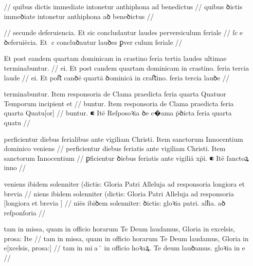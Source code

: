 \ex \bg
\gla
{}
{}
{} {} {} {} {} {} {} {} {} {}
{} {} {} {} {} {} {} {} {} {}
//
\glRekonstrukcja
{} quibus dictis immediate intonetur anthiphona ad benedictus
//
\glU
{}
quibus ꝺictis immeꝺiate intonetur anthiphona aꝺ beneꝺictus
//
\endgl
\eg


\ex \bg
\gla
{}
{} {} {} {} {} {} {} {} {} {}
{} {} {} {} {} {} {} {} {} {}
//
\glRekonstrukcja
{} secunde deferuiencia. Et sic concludautur laudes perversiculum feriale
//
\glU
{}
ſce ꝺeferuiēcia. Et c concluꝺautur lauꝺes ꝑverculum feriale
//
\endgl
\eg



\ex \bg
\gla
{}
{} Et post eandem quartam dominicam in crastino feria tertia laudes
ultimae terminabuntur.
//
\glRekonstrukcja
{}
ei. Et post candem quartam dominicam in crastino. feria tercia laude
//
\glU
{}
ei. Et poﬅ canꝺē quartā ꝺominicā in craﬅino. feria tercia lauꝺe
//
\endgl
\eg




\ex \bg
\gla
{} terminabuntur.
{} Item responsoria de Clama praedicta feria quarta Quatuor Temporum
incipient et 
//
\glRekonstrukcja
{} \relax[termina]buntur.
{} Item responsoria de Clama praedicta feria quarta Quatu[or]
//
\glU
{}
buntur. ⁌ Itē Reſposoꝛia ꝺe c�ama p̄ꝺicta feria quarta quatu
//
\endgl
\eg



\ex \bg
\gla
{} perficientur diebus ferialibus ante vigiliam Christi.
{} Item sanctorum Innocentium dominico veniens
//
\glRekonstrukcja
{} perficientur diebus feriatis ante vigiliam Christi.
{} Item sanctorum Innocentium
//
\glU
{}
ꝑficientur ꝺiebus feriatis ante vigiliā xp̄i. ⁌ Itē ſanctoꝝ inno
//
\endgl
\eg

\ex \bg
\gla
{} veniens ibidem solenniter
(dictis: Gloria Patri Alleluja ad responsoria longiora et brevia 
//
\glRekonstrukcja
{} \relax[ve]niens ibidem solenniter
(dictis: Gloria Patri Alleluja ad responsoria [longiora et brevia ]
//
\glU
{}
niēs ibiꝺem solenniter: ꝺictis: gloꝛia patri. alꝉia. aꝺ reſponſoria   
//
\endgl
\eg



\ex \bg
\gla
{}
tam in
missa, quam in officio horarum Te Deum laudamus, Gloria in excelsis,
prosa: Ite
//
\glRekonstrukcja
{}
tam in
missa, quam in officio horarum Te Deum laudamus, Gloria in e[xcelsis,
prosa:] 
//
\glU
{}
tam in mia ̈ in oﬀicio hoꝛaꝝ. Te deum lauꝺamus. gloꝛia in e 
//
\endgl
\eg

